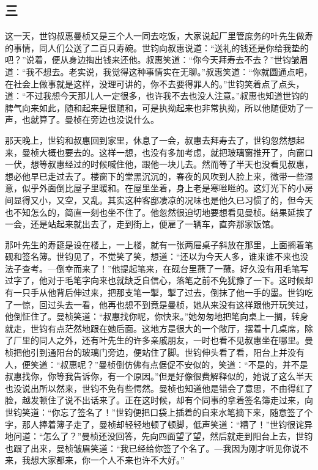 \subsection{三}

\par 这一天，世钧叔惠曼桢又是三个人一同去吃饭，大家说起厂里管庶务的叶先生做寿的事情，同人们公送了二百只寿碗。世钧向叔惠说道：“送礼的钱还是你给我垫的吧？”说着，便从身边掏出钱来还他。叔惠笑道：“你今天拜寿去不去？”世钧皱眉道：“我不想去。老实说，我觉得这种事情实在无聊。”叔惠笑道：“你就圆通点吧，在社会上做事就是这样，没理可讲的，你不去要得罪人的。”世钧笑着点了点头，道：“不过我想今天那儿人一定很多，也许我不去也没人注意。”叔惠也知道世钧的脾气向来如此，随和起来是很随和，可是执拗起来也非常执拗，所以他随便劝了一声，也就算了。曼桢在旁边也没说什么。
\par 那天晚上，世钧和叔惠回到家里，休息了一会，叔惠去拜寿去了，世钧忽然想起来，曼桢大概也要去的。这样一想，也没有多加考虑，就把玻璃窗推开了，向窗口一伏，想等叔惠经过的时候喊住他，跟他一块儿去。然而等了半天也没看见叔惠，想必他早已走过去了。楼窗下的堂黑沉沉的，春夜的风吹到人脸上来，微带一些湿意，似乎外面倒比屋子里暖和。在屋里坐着，身上老是寒咝咝的。这灯光下的小房间显得又小，又空，又乱。其实这种客邸凄凉的况味也是他久已习惯了的，但今天也不知怎么的，简直一刻也坐不住了。他忽然很迫切地要想看见曼桢。结果延挨了一会，还是站起来就出去了，走到街上，便雇了一辆车，直奔那家饭馆。
\par 那叶先生的寿筵是设在楼上，一上楼，就有一张两屉桌子斜放在那里，上面搁着笔砚和签名簿。世钧见了，不觉笑了笑，想道：“还以为今天人多，谁来谁不来也没法子查考。—倒幸而来了！”他提起笔来，在砚台里蘸了一蘸。好久没有用毛笔写过字了，他对于毛笔字向来也就缺乏自信心，落笔之前不免犹豫了一下。这时候却有一只手从他背后伸过来，把那支笔一掣，掣了过去，倒抹了他一手的墨。世钧吃了一惊，回过头去一看，他再也想不到竟是曼桢，她从来没有这样跟他开玩笑过，他倒怔住了。曼桢笑道：“叔惠找你呢，你快来。”她匆匆地把笔向桌上一搁，转身就走，世钧有点茫然地跟在她后面。这地方是很大的一个敞厅，摆着十几桌席，除了厂里的同人之外，还有叶先生的许多亲戚朋友，一时也看不见叔惠坐在哪里。曼桢把他引到通阳台的玻璃门旁边，便站住了脚。世钧伸头看了看，阳台上并没有人，便笑道：“叔惠呢？”曼桢倒仿佛有点倨促不安似的，笑道：“不是的，并不是叔惠找你，你等我告诉你，有一个原因。”但是好像很费解释似的，她说了这么半天也没说出所以然来，世钧不免有些愕然。曼桢也知道他是错会了意思，不由得红了脸，越发顿住了说不出话来了。正在这时候，却有个同事的拿着签名簿走过来，向世钧笑道：“你忘了签名了！”世钧便把口袋上插着的自来水笔摘下来，随意签了个字，那人捧着簿子走了，曼桢却轻轻地顿了顿脚，低声笑道：“糟了！”世钧很诧异地问道：“怎么了？”曼桢还没回答，先向四面望了望，然后就走到阳台上去，世钧也跟了出来，曼桢皱眉笑道：“我已经给你签了个名了。—我因为刚才听见你说不来，我想大家都来，你一个人不来也许不大好。”
